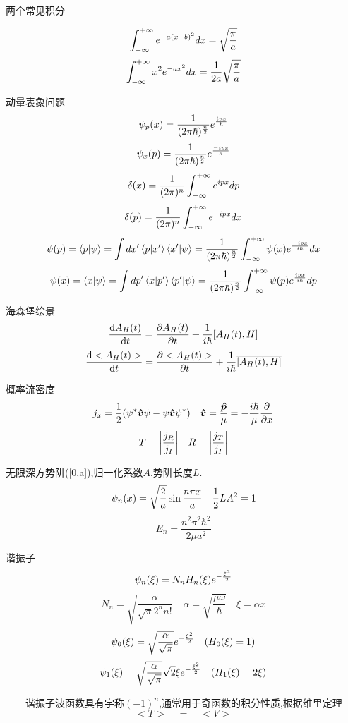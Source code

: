 \documentclass{article}
\begin{document}
\begin{formal}
\begin{enumerate}
                两个常见积分

                $$ \int_{-\infty}^{+\infty} e^{-a (x+b)^{2}} dx = \sqrt{\frac{\pi}{a}} $$
                $$ \int_{-\infty}^{+\infty} x^{2} e^{-a x^{2}} dx = \frac{1}{2a} \sqrt{\frac{\pi}{a}} $$

                动量表象问题
                $$ \psi_{p} (x) = \frac{1}{(2 \pi \hbar)^{\frac{n}{2}}} e^{\frac{ipx}{\hbar}} $$ 
                $$ \psi_{x} (p) = \frac{1}{(2 \pi \hbar)^{\frac{n}{2}}} e^{\frac{-ipx}{\hbar}} $$ 
                $$ \delta(x) = \frac{1}{(2\pi)^{n}} \int_{-\infty}^{+\infty} e^{ipx} dp $$
                $$ \delta(p) = \frac{1}{(2\pi)^{n}} \int_{-\infty}^{+\infty} e^{-ipx} dx $$
                $$ \psi(p) = \braket{p}{\psi} = \int dx' \braket{p}{x'} \braket{x'}{\psi} = \frac{1}{(2 \pi \hbar)^{\frac{n}{2}}} \int_{-\infty}^{+\infty} \psi(x) e^{\frac{-ipx}{i\hbar}} dx $$
                $$ \psi(x) = \braket{x}{\psi} = \int dp' \braket{x}{p'} \braket{p'}{\psi} = \frac{1}{(2 \pi \hbar)^{\frac{n}{2}}} \int_{-\infty}^{+\infty} \psi(p) e^{\frac{ipx}{i\hbar}}  dp $$

                海森堡绘景
                $$ \dv{A_{H}(t)}{t} = \pdv{A_{H}(t)}{t} + \frac{1}{i\hbar} [A_{H}(t),H] $$
                $$ \dv{<A_{H}(t)>}{t} = \pdv{<A_{H}(t)>}{t} + \frac{1}{i\hbar} \overline{[A_{H}(t),H]} $$

                概率流密度
                $$ j_{x} = \frac{1}{2} (\psi^{*} \vu*{v} \psi - \psi \vu*{v} \psi^{*} ) \quad \vu*{v} = \frac{\vu*{p}}{\mu} = - \frac{i\hbar}{\mu} \pdv{x} $$
                $$ T = \abs{\frac{j_{R}}{j_{I}}} \quad R = \abs{\frac{j_{T}}{j_{I}}} $$

                无限深方势阱([0,a]),归一化系数$A$,势阱长度$L$.
                $$ \psi_{n} (x) = \sqrt{\frac{2}{a}} \sin{\frac{n\pi x}{a}} \quad \frac{1}{2} L A^{2}  = 1 $$
                $$ E_{n} = \dfrac{n^{2}\pi^{2}\hbar^{2}}{2\mu a^{2}} $$

                谐振子
                $$ \psi_{n} (\xi) = N_{n} H_{n}(\xi) e^{-\frac{\xi^{2}}{2}} $$
                $$ N_{n} = \sqrt{\frac{\alpha}{\sqrt{\pi}2^{n} n!}}  \quad \alpha = \sqrt{\frac{\mu \omega}{\hbar}} \quad \xi = \alpha x $$
                $$ \psi_{0} (\xi) = \sqrt{\frac{\alpha}{\sqrt{\pi}}} e^{-\frac{\xi^{2}}{2}} \quad (H_{0}(\xi) = 1)$$
                $$ \psi_{1} (\xi) = \sqrt{\frac{\alpha}{\sqrt{\pi}}} \sqrt{2} \xi e^{-\frac{\xi^{2}}{2}} \quad (H_{1}(\xi) = 2\xi) $$
                
                $\qquad$谐振子波函数具有宇称$(-1)^{n}$,通常用于奇函数的积分性质,根据维里定理
                $$  < T > \quad = \quad  < V >  $$
                

\end{enumerate}
\end{formal}
\end{document}

